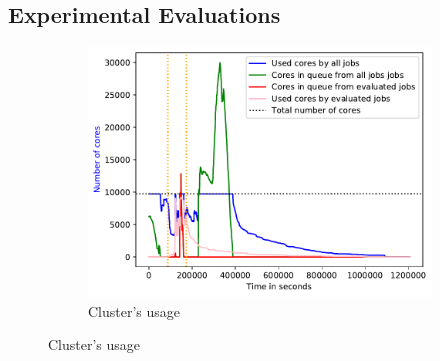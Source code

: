 \documentclass[a4paper]{article}
\begin{document}
\subsection{Experimental Evaluations}

\begin{figure}[H]\centering
\begin{subfigure}[b]{0.4\linewidth}\centering\includegraphics[width=1\linewidth]{MBSS/plot/2022-01-17->2022-01-17_V9271_Fcfs_Used_nodes_450_128_32_256_4_1024.pdf}\caption{Cluster's usage}\end{subfigure}

\end{figure}
\end{document}
